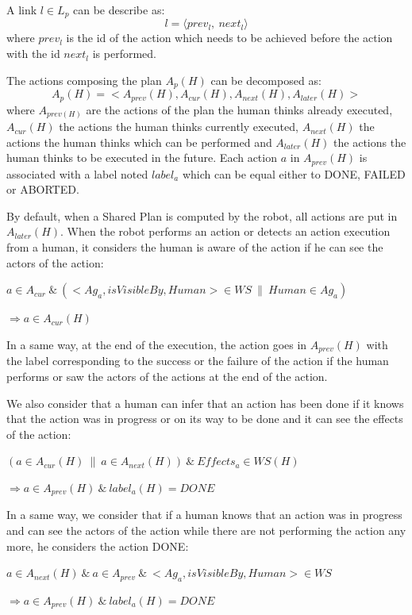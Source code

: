\documentclass[english,a4paper,11pt,twoside]{StyleThese}
\begin{document}
A link $l \in L_p$ can be describe as:
 $$l = \langle prev_l, \ next_l \rangle$$
where $prev_l$ is the id of the action which needs to be achieved before the action with the id $next_l$ is performed. 

The actions composing the plan $A_p(H)$ can be decomposed as:
$$A_p(H) = <A_{prev}(H), A_{cur}(H), A_{next}(H), A_{later}(H)>$$
where $A_{prev(H)}$ are the actions of the plan the human thinks already executed, $A_{cur}(H)$ the actions the human thinks currently executed, $A_{next}(H)$ the actions the human thinks which can be performed and $A_{later}(H)$ the actions the human thinks to be executed in the future. Each action $a$ in $A_{prev}(H)$ is associated with a label noted $label_a$ which can be equal either to DONE, FAILED or ABORTED.

By default, when a Shared Plan is computed by the robot, all actions are put in $A_{later}(H)$. When the robot performs an action or detects an action execution from a human, it considers the human is aware of the action if he can see the actors of the action:

\begin{center}
$a \in A_{cur} \ \& \ (<Ag_a, isVisibleBy, Human> \in WS \ \| \ Human \in Ag_a)$ 

$\Rightarrow a \in A_{cur}(H)$
\end{center}

In a same way, at the end of the execution, the action goes in $A_{prev}(H)$ with the label corresponding to the success or the failure of the action if the human performs or saw the actors of the actions at the end of the action.

We also consider that a human can infer that an action has been done if it knows that the action was in progress or on its way to be done and it can see the effects of the action:

\begin{center}
$(a \in A_{cur}(H) \ \| \ a \in A_{next}(H)) \ \& \ Effects_{a} \in WS(H)$ 

$\Rightarrow a \in A_{prev}(H) \ \& \ label_a(H) = DONE$
\end{center}

In a same way, we consider that if a human knows that an action was in progress and can see the actors of the action while there are not performing the action any more, he considers the action DONE:

\begin{center}
$a \in A_{next}(H) \ \& \ a \in A_{prev} \ \& \ <Ag_a, isVisibleBy, Human> \in WS$

$\Rightarrow a \in A_{prev}(H) \ \& \ label_a(H) = DONE$
\end{center}
\end{document}
